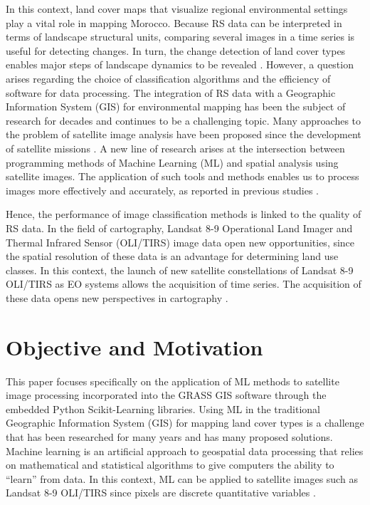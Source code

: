 \documentclass[geomatics,article,accept,pdftex,oneauthor]{Definitions/mdpi}
\begin{document}
In this context, land cover maps that visualize regional environmental settings play a vital role in mapping Morocco. Because RS data can be interpreted in terms of landscape structural units, comparing several images in a time series is useful for detecting changes. In turn, the change detection of land cover types enables major steps of landscape dynamics to be revealed \cite{CAI2023103226,Lemenkova202405,XIONG2022109132}. However, a question arises regarding the choice of classification algorithms and the efficiency of software for data processing. The integration of RS data with a Geographic Information System (GIS) for environmental mapping has been the subject of research for decades and continues to be a challenging topic. Many approaches to the problem of satellite image analysis have been proposed since the development of satellite missions \cite{NOY2023103377,Lemenkova202403,Su02062020,Potter18102014,Lemenkova202402}. A new line of research  arises at the intersection between programming methods of Machine Learning (ML) and spatial analysis using satellite images. The application of such tools and methods enables us to process images more effectively and accurately, as reported in previous studies \cite{rs16244812,w17010050,fire8010008}. 

Hence, the performance of image classification methods is linked to the quality of RS data. In the field of cartography, Landsat 8-9 Operational Land Imager and Thermal Infrared Sensor (OLI/TIRS) image data open new opportunities, since the spatial resolution of these data is an advantage for determining land use classes. In this context, the launch of new satellite constellations of Landsat 8-9 OLI/TIRS as EO systems allows the acquisition of time series. The acquisition of these data opens new perspectives in cartography \cite{Farah05012010,Lemenkova202322,Layati03042022,Layati28082024}.

\section{Objective and Motivation}

This paper focuses specifically on the application of ML methods to satellite image processing incorporated into the GRASS GIS software through the embedded Python Scikit-Learning libraries. Using ML in the traditional Geographic Information System (GIS) for mapping land cover types is a challenge that has been researched for many years and has many proposed solutions. Machine learning is an artificial approach to geospatial data processing that relies on mathematical and statistical algorithms to give computers the ability to “learn” from data. In this context, ML can be applied to satellite images such as Landsat 8-9 OLI/TIRS since pixels are discrete quantitative variables \cite{DAPAZGOMES,Lemenkova202026,LAROCHEPINEL2024109163}. 
\end{document}

